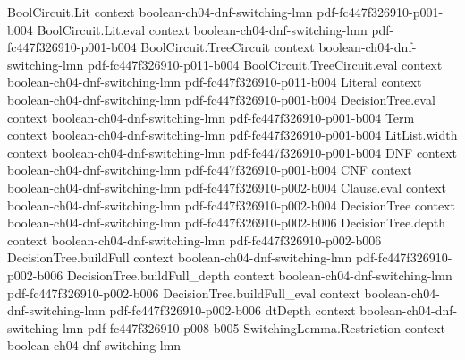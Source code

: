 \begin{lemma}
\label{LMN.or_children_have_dnf}
\leanok
{}
\proofstep
  {BoolCircuit.Lit}
  {context}
  {boolean-ch04-dnf-switching-lmn}
  {pdf-fc447f326910-p001-b004}
\proofstep
  {BoolCircuit.Lit.eval}
  {context}
  {boolean-ch04-dnf-switching-lmn}
  {pdf-fc447f326910-p001-b004}
\proofstep
  {BoolCircuit.TreeCircuit}
  {context}
  {boolean-ch04-dnf-switching-lmn}
  {pdf-fc447f326910-p011-b004}
\proofstep
  {BoolCircuit.TreeCircuit.eval}
  {context}
  {boolean-ch04-dnf-switching-lmn}
  {pdf-fc447f326910-p011-b004}
\proofstep
  {Literal}
  {context}
  {boolean-ch04-dnf-switching-lmn}
  {pdf-fc447f326910-p001-b004}
\proofstep
  {DecisionTree.eval}
  {context}
  {boolean-ch04-dnf-switching-lmn}
  {pdf-fc447f326910-p001-b004}
\proofstep
  {Term}
  {context}
  {boolean-ch04-dnf-switching-lmn}
  {pdf-fc447f326910-p001-b004}
\proofstep
  {LitList.width}
  {context}
  {boolean-ch04-dnf-switching-lmn}
  {pdf-fc447f326910-p001-b004}
\proofstep
  {DNF}
  {context}
  {boolean-ch04-dnf-switching-lmn}
  {pdf-fc447f326910-p001-b004}
\proofstep
  {CNF}
  {context}
  {boolean-ch04-dnf-switching-lmn}
  {pdf-fc447f326910-p002-b004}
\proofstep
  {Clause.eval}
  {context}
  {boolean-ch04-dnf-switching-lmn}
  {pdf-fc447f326910-p002-b004}
\proofstep
  {DecisionTree}
  {context}
  {boolean-ch04-dnf-switching-lmn}
  {pdf-fc447f326910-p002-b006}
\proofstep
  {DecisionTree.depth}
  {context}
  {boolean-ch04-dnf-switching-lmn}
  {pdf-fc447f326910-p002-b006}
\proofstep
  {DecisionTree.buildFull}
  {context}
  {boolean-ch04-dnf-switching-lmn}
  {pdf-fc447f326910-p002-b006}
\proofstep
  {DecisionTree.buildFull_depth}
  {context}
  {boolean-ch04-dnf-switching-lmn}
  {pdf-fc447f326910-p002-b006}
\proofstep
  {DecisionTree.buildFull_eval}
  {context}
  {boolean-ch04-dnf-switching-lmn}
  {pdf-fc447f326910-p002-b006}
\proofstep
  {dtDepth}
  {context}
  {boolean-ch04-dnf-switching-lmn}
  {pdf-fc447f326910-p008-b005}
\proofstep
  {SwitchingLemma.Restriction}
  {context}
  {boolean-ch04-dnf-switching-lmn}

\end{lemma}
